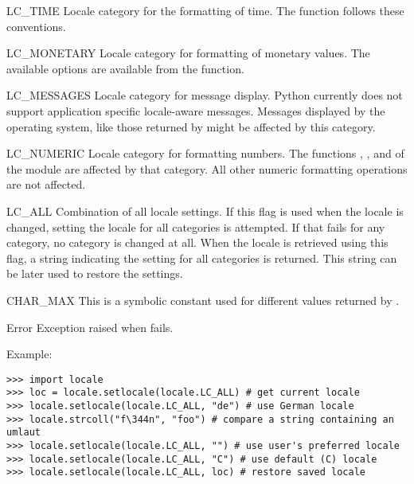 \begin{datadesc}{LC_TIME}
Locale category for the formatting of time. The function
 follows these conventions.
\end{datadesc}

\begin{datadesc}{LC_MONETARY}
Locale category for formatting of monetary values. The available
options are available from the  function.
\end{datadesc}

\begin{datadesc}{LC_MESSAGES}
Locale category for message display. Python currently does not support
application specific locale-aware messages. Messages displayed by the
operating system, like those returned by  might
be affected by this category.
\end{datadesc}

\begin{datadesc}{LC_NUMERIC}
Locale category for formatting numbers. The functions
, ,  and  of the
 module are affected by that category. All other numeric
formatting operations are not affected.
\end{datadesc}

\begin{datadesc}{LC_ALL}
Combination of all locale settings. If this flag is used when the
locale is changed, setting the locale for all categories is
attempted. If that fails for any category, no category is changed at
all. When the locale is retrieved using this flag, a string indicating
the setting for all categories is returned. This string can be later
used to restore the settings.
\end{datadesc}

\begin{datadesc}{CHAR_MAX}
This is a symbolic constant used for different values returned by
.
\end{datadesc}

\begin{excdesc}{Error}
Exception raised when  fails.
\end{excdesc}

Example:

\begin{verbatim}
>>> import locale
>>> loc = locale.setlocale(locale.LC_ALL) # get current locale
>>> locale.setlocale(locale.LC_ALL, "de") # use German locale
>>> locale.strcoll("f\344n", "foo") # compare a string containing an umlaut 
>>> locale.setlocale(locale.LC_ALL, "") # use user's preferred locale
>>> locale.setlocale(locale.LC_ALL, "C") # use default (C) locale
>>> locale.setlocale(locale.LC_ALL, loc) # restore saved locale
\end{verbatim}

